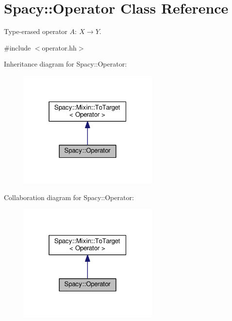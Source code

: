\hypertarget{classSpacy_1_1Operator}{}\section{Spacy\+:\+:Operator Class Reference}
\label{classSpacy_1_1Operator}


Type-\/erased operator $A:\ X \to Y $.  




{\ttfamily \#include $<$operator.\+hh$>$}



Inheritance diagram for Spacy\+:\+:Operator\+:\nopagebreak
\begin{figure}[H]
\begin{center}
\leavevmode
\includegraphics[width=199pt]{classSpacy_1_1Operator__inherit__graph}
\end{center}
\end{figure}


Collaboration diagram for Spacy\+:\+:Operator\+:\nopagebreak
\begin{figure}[H]
\begin{center}
\leavevmode
\includegraphics[width=199pt]{classSpacy_1_1Operator__coll__graph}
\end{center}
\end{figure}
